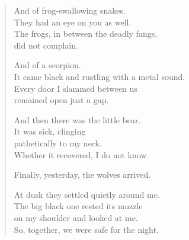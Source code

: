 {\begin{verse}
And of frog-swallowing snakes.\\
They had an eye on you as well.\\
The frogs, in between the deadly fangs,\\
did not complain.

And of a scorpion.\\
It came black and rustling with a metal sound.\\
Every door I slammed between us\\
remained open just a gap.

And then there was the little bear.\\
It was sick, clinging\\
pathetically to my neck.\\
Whether it recovered, I do not know.

Finally, yesterday, the wolves arrived.

At dusk they settled quietly around me.\\
The big black one rested its muzzle\\
on my shoulder and looked at me.\\
So, together, we were safe for the night.
\end{verse}

}

